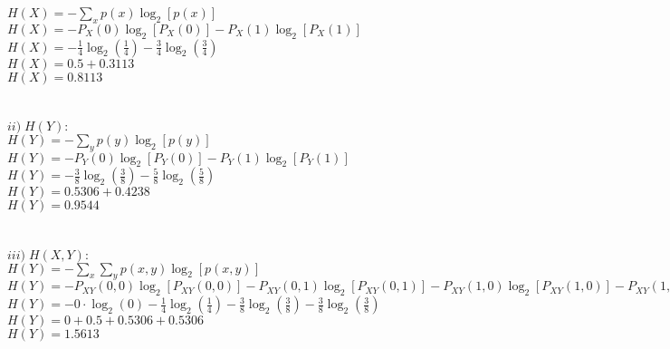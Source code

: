 \documentclass[a4paper]{article}
\begin{document}
$ \displaystyle H(X) = -\sum_{x} p(x) \log_2 [p(x)]         $\\
$ H(X) = -P_X(0) \log_2 [P_X(0)] -P_X(1) \log_2 [P_X(1)]    $\\
$ \displaystyle 
    H(X) = - \frac{1}{4} \log_2 \left( \frac{1}{4} \right) 
           - \frac{3}{4} \log_2 \left( \frac{3}{4} \right)  $\\
$ H(X) = 0.5 + 0.3113                                       $\\
$ \boxed{ H(X) = 0.8113 }                                   $\\
\\
\\
$ ii) \; H(Y):                                              $\\
$ \displaystyle H(Y) = -\sum_{y} p(y) \log_2 [p(y)]         $\\
$ H(Y) = -P_Y(0) \log_2 [P_Y(0)] -P_Y(1) \log_2 [P_Y(1)]    $\\
$ \displaystyle 
    H(Y) = - \frac{3}{8} \log_2 \left( \frac{3}{8} \right) 
           - \frac{5}{8} \log_2 \left( \frac{5}{8} \right)  $\\
$ H(Y) = 0.5306 + 0.4238                                    $\\
$ \boxed{ H(Y) = 0.9544 }                                   $\\
\\
\\
$ iii) \; H(X,Y):                                           $\\
$ \displaystyle 
    H(Y) = -\sum_x \sum_y p(x,y) \log_2 [p(x,y)]            $\\
$ H(Y) = - P_{XY}(0,0) \log_2 [P_{XY}(0,0)]                
         - P_{XY}(0,1) \log_2 [P_{XY}(0,1)] 
         - P_{XY}(1,0) \log_2 [P_{XY}(1,0)] 
         - P_{XY}(1,1) \log_2 [P_{XY}(1,1)]                 $\\
$ \displaystyle
    H(Y) = - 0 \cdot \log_2 (0)                              
          - \frac{1}{4} \log_2 \left( \frac{1}{4} \right)
          - \frac{3}{8} \log_2 \left( \frac{3}{8} \right)
          - \frac{3}{8} \log_2 \left( \frac{3}{8} \right)   $\\
$ H(Y) = 0 + 0.5 + 0.5306 + 0.5306                          $\\
$ \boxed{ H(Y) = 1.5613 }                                   $\\
\\
\\
\end{document}
